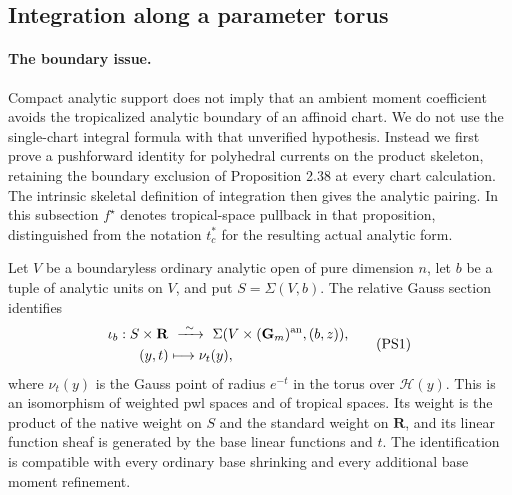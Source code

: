 \subsection{Integration along a parameter torus}

\paragraph{The boundary issue.}
Compact analytic support does not imply that an ambient moment
coefficient avoids the tropicalized analytic boundary of an affinoid
chart.  We do not use the single-chart integral formula with that
unverified hypothesis.  Instead we first prove a pushforward identity
for polyhedral currents on the product skeleton, retaining the boundary
exclusion of Proposition 2.38 at every chart calculation.  The
intrinsic skeletal definition of integration then gives the analytic
pairing.  In this subsection $f^\star$ denotes tropical-space pullback
in that proposition, distinguished from the notation $t_c^*$ for the
resulting actual analytic form.

\begin{lemma}
\label{r11p:coordinate-product-skeleton}
Let $V$ be a boundaryless ordinary analytic open of pure dimension $n$,
let $b$ be a tuple of analytic units on $V$, and put $S=\Sigma(V,b)$.
The relative Gauss section identifies
\[
 \begin{split}
 \iota_b:S\times\mathbf R&\ \xrightarrow{\ \sim\ }\
       \Sigma(V\times(\mathbf G_m)^{\rm an},(b,z)),\\
                  (y,t)&\longmapsto \nu_t(y),
 \end{split}
\tag{PS1}\label{r11p:product-skeleton-identity}
\]
where $\nu_t(y)$ is the Gauss point of radius $e^{-t}$ in the torus
over $\mathcal H(y)$.  This is an isomorphism of weighted pwl spaces
and of tropical spaces.  Its weight is the product of the native
weight on $S$ and the standard weight on $\mathbf R$, and its linear
function sheaf is generated by the base linear functions and $t$.
The identification is compatible with every ordinary base shrinking
and every additional base moment refinement.
\end{lemma}

